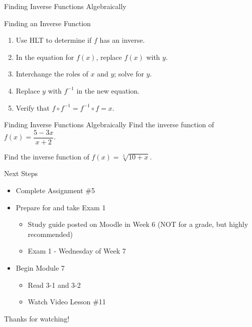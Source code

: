 \documentclass{beamer}
\begin{document}
\begin{frame}[t]{Finding Inverse Functions Algebraically}
\begin{block}{Finding an Inverse Function}
\begin{enumerate}[1)]
\item Use HLT to determine if $f$ has an inverse.
\item In the equation for $f(x)$, replace $f(x)$ with $y$.
\item Interchange the roles of $x$ and $y$; solve for $y$.
\item Replace $y$ with $f^{-1}$ in the new equation.
\item Verify that $f\circ f^{-1} = f^{-1}\circ f = x$.
\end{enumerate}
\end{block}
\end{frame}

\begin{frame}[t]{Finding Inverse Functions Algebraically}
Find the inverse function of $f(x) = \dfrac{5-3x}{x+2}$.

\pause \vfill

Find the inverse function of $f(x) = \sqrt[3]{10 + x}$.
\end{frame}

\begin{frame}[t]{Next Steps}
\begin{itemize}
\item Complete Assignment \#5
\item Prepare for and take Exam 1
\begin{itemize}
	\item Study guide posted on Moodle in Week 6 (NOT for a grade, but highly recommended)
	\item Exam 1 - Wednesday of Week 7
\end{itemize}
\item Begin Module 7
\begin{itemize}
	\item Read 3-1 and 3-2
	\item Watch Video Lesson \#11
\end{itemize}
\end{itemize}

\vfill

Thanks for watching!
\end{frame}
\end{document}
